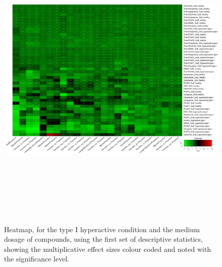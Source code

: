 \documentclass[a4paper,12pt]{article}
\begin{document}
\begin{figure}[h!]
\begin{center}
\includegraphics[width=16cm,height=15cm]{DarkApoHigh_heatmap_3_microM_DarkApoHigh_B2MAP.png}
\caption{Heatmap, for the type I hyperactive condition and the medium dosage of compounds, using the first set of descriptive statistics, showing the multiplicative effect sizes colour coded and noted with the significance level.}
\end{center}
\end{figure}
\newpage
\end{document}

